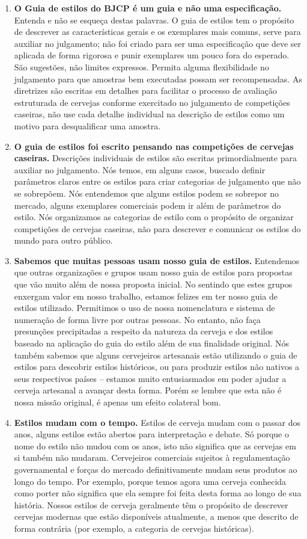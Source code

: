 \begin{enumerate}
\item \textbf{O Guia de estilos do BJCP é um guia e não uma especificação.} Entenda e não se esqueça destas palavras. O guia de estilos tem o propósito de descrever as características gerais e os exemplares mais comuns, serve para auxiliar no julgamento; não foi criado para ser uma especificação que deve ser aplicada de forma rigorosa e punir exemplares um pouco fora do esperado. São sugestões, não limites expressos. Permita alguma flexibilidade no julgamento para que amostras bem executadas possam ser recompensadas. As diretrizes são escritas em detalhes para facilitar o processo de avaliação estruturada de cervejas conforme exercitado no julgamento de competições caseiras, não use cada detalhe individual na descrição de estilos como um motivo para desqualificar uma amostra.
\item \textbf{O guia de estilos foi escrito pensando nas competições de cervejas caseiras.} Descrições individuais de estilos são escritas primordialmente para auxiliar no julgamento. Nós temos, em alguns casos, buscado definir parâmetros claros entre os estilos para criar categorias de julgamento que não se sobrepõem. Nós entendemos que alguns estilos podem se sobrepor no mercado, alguns exemplares comerciais podem ir além de parâmetros do estilo. Nós organizamos as categorias de estilo com o propósito de organizar competições de cervejas caseiras, não para descrever e comunicar os estilos do mundo para outro público.
\item \textbf{Sabemos que muitas pessoas usam nosso guia de estilos.} Entendemos que outras organizações e grupos usam nosso guia de estilos para propostas que vão muito além de nossa proposta inicial. No sentindo que estes grupos enxergam valor em nosso trabalho, estamos felizes em ter nosso guia de estilos utilizado. Permitimos o uso de nossa nomenclatura e sistema de numeração de forma livre por outras pessoas. No entanto, não faça presunções precipitadas a respeito da natureza da cerveja e dos estilos baseado na aplicação do guia do estilo além de sua finalidade original. Nós também sabemos que alguns cervejeiros artesanais estão utilizando o guia de estilos para descobrir estilos históricos, ou para produzir estilos não nativos a seus respectivos países – estamos muito entusiasmados em poder ajudar a cerveja artesanal a avançar desta forma. Porém se lembre que esta não é nossa missão original, é apenas um efeito colateral bom.
\item \textbf{Estilos mudam com o tempo.} Estilos de cerveja mudam com o passar dos anos, alguns estilos estão abertos para interpretação e debate. Só porque o nome do estilo não mudou com os anos, isto não significa que as cervejas em si também não mudaram. Cervejeiros comerciais sujeitos à regulamentação governamental e forças do mercado definitivamente mudam seus produtos ao longo do tempo. Por exemplo, porque temos agora uma cerveja conhecida como porter não significa que ela sempre foi feita desta forma ao longo de sua história. Nossos estilos de cerveja geralmente têm o propósito de descrever cervejas modernas que estão disponíveis atualmente, a menos que descrito de forma contrária (por exemplo, a categoria de cervejas históricas).

\end{enumerate}
